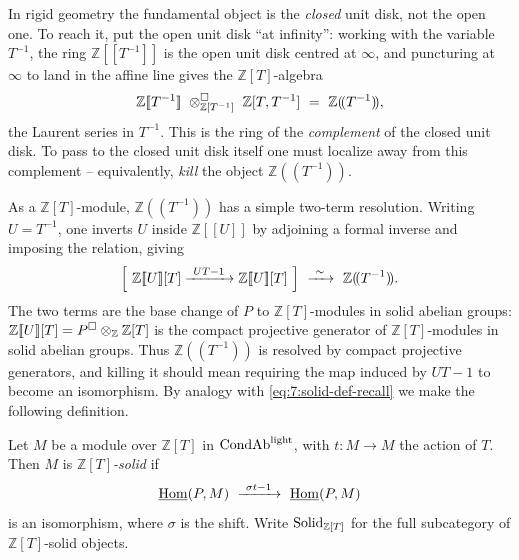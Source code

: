 In rigid geometry the fundamental object is the \emph{closed} unit disk, not
the open one. To reach it, put the open unit disk ``at infinity'': working with
the variable $T^{-1}$, the ring $\mathbb{Z}[\![T^{-1}]\!]$ is the open unit
disk centred at $\infty$, and puncturing at $\infty$ to land in the affine line
gives the $\mathbb{Z}[T]$-algebra
\begin{equation}
\label{eq:7:complement}
\mathbb{Z}[\![T^{-1}]\!]\ \otimes^{\square}_{\mathbb{Z}[T^{-1}]}\
\mathbb{Z}[T,T^{-1}]\ =\ \mathbb{Z}(\!(T^{-1})\!),
\end{equation}
the Laurent series in $T^{-1}$. This is the ring of the \emph{complement} of
the closed unit disk. To pass to the closed unit disk itself one must localize
away from this complement -- equivalently, \emph{kill} the object
$\mathbb{Z}(\!(T^{-1})\!)$.

As a $\mathbb{Z}[T]$-module, $\mathbb{Z}(\!(T^{-1})\!)$ has a simple two-term
resolution. Writing $U=T^{-1}$, one inverts $U$ inside $\mathbb{Z}[\![U]\!]$ by
adjoining a formal inverse and imposing the relation, giving
\begin{equation}
\label{eq:7:complement-resolution}
\Bigl[\ \mathbb{Z}[\![U]\!][T]\xrightarrow{\ UT-1\ }\mathbb{Z}[\![U]\!][T]\ \Bigr]
\ \xrightarrow{\ \sim\ }\ \mathbb{Z}(\!(T^{-1})\!).
\end{equation}
The two terms are the base change of $P$ to $\mathbb{Z}[T]$-modules in solid
abelian groups: $\mathbb{Z}[\![U]\!][T]=P^{\square}\otimes_{\mathbb{Z}}
\mathbb{Z}[T]$ is the compact projective generator of $\mathbb{Z}[T]$-modules
in solid abelian groups. Thus $\mathbb{Z}(\!(T^{-1})\!)$ is resolved by
compact projective generators, and killing it should mean requiring the map
induced by $UT-1$ to become an isomorphism. By analogy with
\eqref{eq:7:solid-def-recall} we make the following definition.

\begin{definition}
\label{def:7:ZT-solid}
Let $M$ be a module over $\mathbb{Z}[T]$ in $\mathrm{CondAb}^{\mathrm{light}}$, with $t\colon M\to M$
the action of $T$. Then $M$ is \emph{$\mathbb{Z}[T]$-solid} if
\begin{equation}
\label{eq:7:ZT-solid-def}
\underline{\operatorname{Hom}}(P,M)\ \xrightarrow{\ \sigma t-1\ }\ \underline{\operatorname{Hom}}(P,M)
\end{equation}
is an isomorphism, where $\sigma$ is the shift. Write $\mathrm{Solid}_{\mathbb{Z}[T]}$
for the full subcategory of $\mathbb{Z}[T]$-solid objects.
\end{definition}

